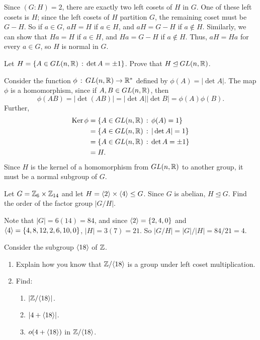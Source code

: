 \begin{solution}[print=true]
Since $(G:H)=2$, there are exactly two left
    cosets of $H$ in $G$.  One of these left cosets is
    $H$; since the left cosets of $H$ partition $G$,
    the remaining coset must be $G-H$.  So if $a\in G$,
    $aH=H$ if $a\in H$, and $aH=G-H$ if $a\notin H$.
    Similarly, we can show that $Ha=H$ if $a\in H$, and
    $Ha=G-H$ if $a\notin H$. Thus, $aH=Ha$ for every
    $a\in G$, so $H$ is normal in $G$.
\end{solution}

\begin{exercise}
Let $H=\{A\in GL(n,\mathbb{R})\,:\,\det A=\pm 1\}$.  Prove that $H\unlhd GL(n,\mathbb{R})$.

\end{exercise}

\begin{solution}[print=true]
Consider the function $\phi \,:\,GL(n, \mathbb{R})\to \mathbb{R}^*$ defined by
$\phi(A)=|\det A|$. The map $\phi$ is a
homomorphism, since if $A,B\in GL(n,\mathbb{R})$, then
$$\phi(AB)=|\det(AB)|=|\det A||\det B|=\phi(A)\phi(B).$$  Further,
\begin{align*}\operatorname{Ker} \phi&=\{A\in GL(n,\mathbb{R})\,:\,
\phi(A)=1\}\\&=\{A\in GL(n,\mathbb{R})\,:\, |\det A|=1\}\\&=\{A\in
GL(n,\mathbb{R})\,:\, \det A=\pm 1\}\\&=H.\end{align*} Since $H$ is
the kernel of a homomorphism from $GL(n,\mathbb{R})$ to another group, it must be a
normal subgroup of $G$.
\end{solution}



\begin{exercise} Let $G=\mathbb{Z}_6\times \mathbb{Z}_{14}$ and let $H=\langle2\rangle\times \langle4\rangle\leq G$.  Since $G$ is abelian, $H\unlhd G$.  Find the order of the factor group $|G/H|$.
\end{exercise}

\begin{solution}[print=true]
Note that $|G|=6(14)=84$, and since $\langle2\rangle=\{2,4,0\}$ and $\langle4\rangle=\{4,8,12,2,6,10,0\}$, $|H|=3(7)=21$. So $|G/H|=|G|/|H|=84/21=4$.
\end{solution}



\begin{exercise}
Consider the subgroup $\langle18\rangle$ of $\mathbb{Z}$.

\begin{enumerate}
\item Explain how you know that $\mathbb{Z}/\langle18\rangle$ is a group under left coset multiplication.
\item Find:

\begin{enumerate}
\item $|\mathbb{Z}/\langle18\rangle|$.
\item $|4+\langle18\rangle|$.
\item $o(4+\langle18\rangle)$ in $\mathbb{Z}/\langle18\rangle$.
\end{enumerate}
\end{enumerate}

\end{exercise}


